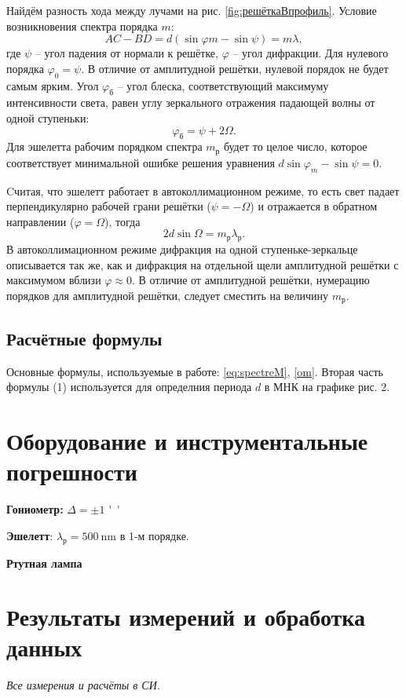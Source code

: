 \documentclass[a4paper]{article}
\newcommand{\Equip}[3]{

	{\bf #1:} $\Delta = \pm #2$ \si{#3}}
\newcommand{\equip}[1]{

	{\bf #1}}
\begin{document}
Найдём разность хода между лучами на рис. \ref{fig:решёткаВпрофиль}. Условие возникновения спектра порядка $ m $:
\begin{equation}\label{eq:spectreM}
	A C - B D = d (\sin \varphi m- \sin \psi) = m \lambda,
\end{equation}
где $ \psi $ -- угол падения от нормали к решётке, $ \varphi $ -- угол дифракции.
Для нулевого порядка $ \varphi_0 = \psi $. В отличие от амплитудной решётки, нулевой порядок не будет самым ярким. Угол $ \varphi_б $ -- угол блеска, соответствующий максимуму интенсивности света, равен углу зеркального отражения падающей волны от одной ступеньки:
\begin{equation*}\label{key}
	\varphi_б = \psi+ 2 \Omega.
\end{equation*}
Для эшелетта рабочим порядком спектра $  m_р$ будет то целое число, которое соответствует минимальной ошибке решения уравнения $d \sin \varphi_m - \sin \psi = 0 $.

Cчитая, что эшелетт работает в автоколлимационном режиме, то есть свет падает перпендикулярно рабочей грани решётки ($ \psi = -\Omega $) и отражается в обратном направлении ($ \varphi = \Omega $), тогда
\begin{equation}\label{om}
	2 d \sin \Omega = m_р \lambda_р.
\end{equation}
В автоколлимационном режиме дифракция на одной ступеньке-зеркальце описывается так же, как и дифракция на отдельной щели амплитудной решётки с максимумом вблизи $ \varphi \approx 0 $. В отличие от амплитудной решётки, нумерацию порядков для амплитудной решётки, следует сместить на величину $ m_р $.

\subsection{Расчётные формулы}

Основные формулы, используемые в работе: \eqref{eq:spectreM}, \eqref{om}. Вторая часть формулы (1) используется для определния периода $ d $ в МНК на графике рис. 2.

\section{Оборудование и инструментальные погрешности}

\Equip{Гониометр}{1}{''}
\equip{Эшелетт}: $ \lambda_р = \SI{500}{\nano \metre} $ в 1-м порядке.
\equip{Ртутная лампа}

\section{Результаты измерений и обработка данных}
\emph{Все измерения и расчёты в СИ.}
\end{document}

